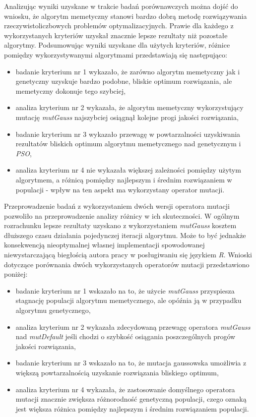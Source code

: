 \par
Analizując wyniki uzyskane w trakcie badań porównawczych można dojść do wniosku, że algorytm memetyczny stanowi bardzo dobrą metodę rozwiązywania rzeczywistoliczbowych problemów optymalizacyjnych. Prawie dla każdego z wykorzystanych kryteriów uzyskał znacznie lepsze rezultaty niż pozostałe algorytmy. Podsumowując wyniki uzyskane dla użytych kryteriów, różnice pomiędzy wykorzystywanymi algorytmami przedstawiają się następująco:
\begin{itemize}
\item badanie kryterium nr 1 wykazało, że zarówno algorytm memetyczny jak i genetyczny uzyskuje bardzo podobne, bliskie optimum rozwiązania, ale memetyczny dokonuje tego szybciej, 
\item analiza kryterium nr 2 wykazała, że algorytm memetyczny wykorzystujący mutację \emph{mutGauss} najszybciej osiągnął kolejne progi jakości rozwiązania, 
\item badanie kryterium nr 3 wykazało przewagę w powtarzalności uzyskiwania rezultatów bliskich optimum algorytmu memetycznego nad genetycznym i \emph{PSO},
\item analiza kryterium nr 4 nie wykazała większej zależności pomiędzy użytym algorytmem, a różnicą pomiędzy najlepszym i średnim rozwiązaniem w populacji - wpływ na ten aspekt ma wykorzystany operator mutacji.
\end{itemize}

\par 
Przeprowadzenie badań z wykorzystaniem dwóch wersji operatora mutacji pozwoliło na przeprowadzenie analizy różnicy w ich skuteczności. W ogólnym rozrachunku lepsze rezultaty uzyskano z wykorzystaniem \emph{mutGauss} kosztem dłuższego czasu działania pojedynczej iteracji algorytmu. Może to być jednakże konsekwencją nieoptymalnej własnej implementacji spowodowanej niewystarczającą biegłością autora pracy w posługiwaniu się językiem \emph{R}. Wnioski dotyczące porównania dwóch wykorzystanych operatorów mutacji przedstawiono poniżej:
\begin{itemize}
\item badanie kryterium nr 1 wskazało na to, że użycie \emph{mutGauss} przyspiesza stagnację populacji algorytmu memetycznego, ale opóźnia ją w przypadku algorytmu genetycznego,
\item analiza kryterium nr 2 wykazała zdecydowaną przewagę operatora \emph{mutGauss} nad \emph{mutDefault} jeśli chodzi o szybkość osiągania poszczególnych progów jakości rozwiązania,
\item badanie kryterium nr 3 wskazało na to, że mutacja gaussowska umożliwia z większą powtarzalnością uzyskanie rozwiązania bliskiego optimum,
\item analiza kryterium nr 4 wykazała, że zastosowanie domyślnego operatora mutacji znacznie zwiększa różnorodność genetyczną populacji, czego oznaką jest większa różnica pomiędzy najlepszym i średnim rozwiązaniem populacji.
\end{itemize}

